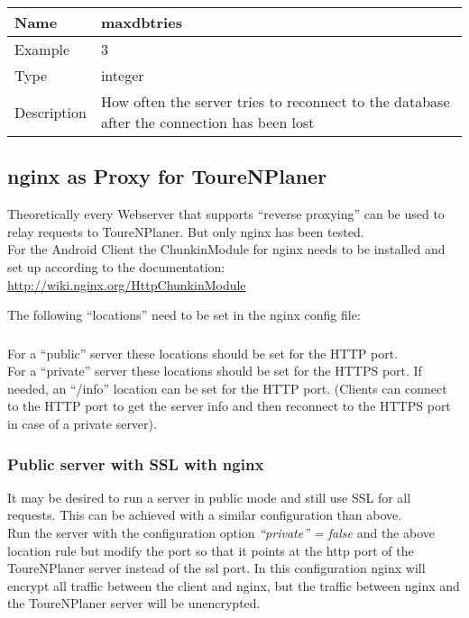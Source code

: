 \documentclass[ngerman,titlepage,parskip=true]{scrartcl}
\newcommand{\configoption}[4]
{%
\setlength{\extrarowheight}{2pt}
\begin{tabular}{|p{0.2\textwidth}|p{0.9\textwidth}|}
\hline
  \textbf{Name} & \textbf{#1}\\\hline
  Example & #2\\\hline
  Type & #3\\\hline
  Description & #4\\\hline
\end{tabular}
}
\begin{document}
\configoption
{maxdbtries}
{3}
{integer}
{How often the server tries to reconnect to the database after the connection has been lost}

\subsection{nginx as Proxy for ToureNPlaner}

Theoretically every Webserver that supports ``reverse proxying'' can be used to relay requests to ToureNPlaner. But only nginx has been tested.\\

For the Android Client the ChunkinModule for nginx needs to be installed and set up according to the documentation:
\url{http://wiki.nginx.org/HttpChunkinModule}

The following ``locations'' need to be set in the nginx config file:



\subsubsection{}
For a ``public'' server these locations should be set for the HTTP port.\\
For a ``private'' server these locations should be set for the HTTPS port. If needed, an ``/info'' location can be set for the HTTP port. (Clients can connect to the HTTP port to get the server info and then reconnect to the HTTPS port in case of a private server).

\subsubsection{Public server with SSL with nginx}

It may be desired to run a server in public mode and still use SSL for all requests. This can be achieved with a similar configuration than above.\\
Run the server with the configuration option \textit{``private'' = false} and the above location rule but modify the port so that it points at the http port of the ToureNPlaner server instead of the ssl port.
In this configuration nginx will encrypt all traffic between the client and nginx, but the traffic between nginx and the ToureNPlaner server will be unencrypted.
\end{document}
